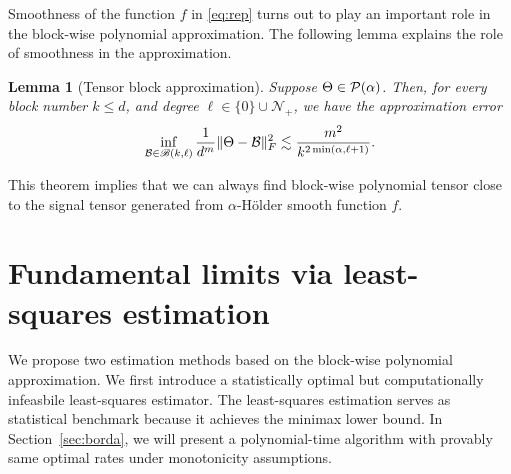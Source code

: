 \documentclass{article}
\newtheorem{lem}{Lemma}
\theoremstyle{definition}
\newtheorem{defn}{Definition}
\def\caliB{\mathscr{B}}
\begin{document}
Smoothness of the function $f$ in \eqref{eq:rep} turns out to play an important role in the block-wise polynomial approximation.
The following lemma explains the role of smoothness in the approximation. 
\begin{lem}[Tensor block approximation]\label{lem:approx}
Suppose  $\Theta\in\mathcal{P}(\alpha)$. Then,
for every block number $k\leq d$, and degree $\ell\in\{0\}\cup\mathcal{N}_+$, we have the approximation error
\begin{align}
   \inf_{\tB\in\caliB(k,\ell)} \frac{1}{d^m}\FnormSize{}{\Theta-\tB}^2\lesssim \frac{m^2}{k^{2\min(\alpha,\ell+1)}}.
\end{align}
\end{lem}
This theorem implies that we can always find block-wise polynomial tensor close to the signal tensor generated from $\alpha$-H\"older smooth function $f$.


\vspace{-.2cm}
\section{Fundamental limits via least-squares estimation}\label{sec:lse}
\vspace{-.2cm}
We propose two estimation methods based on the block-wise polynomial approximation. We first introduce a statistically optimal but computationally infeasbile least-squares estimator. The least-squares estimation serves as statistical benchmark because it achieves the minimax lower bound. In Section~\ref{sec:borda}, we will present a polynomial-time algorithm with provably same optimal rates under monotonicity assumptions.
\end{document}
